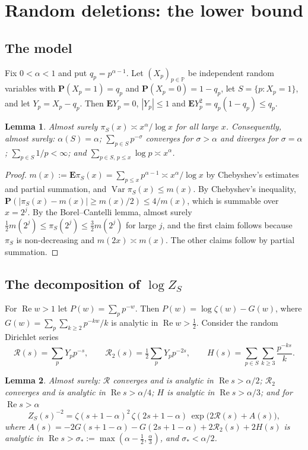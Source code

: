 \documentclass[11pt]{amsart}
\newtheorem{lemma}{Lemma}[section]
\theoremstyle{remark}
\numberwithin{equation}{section}
\newcommand{\PP}{\mathbb{P}}
\newcommand{\Prob}{\mathbf{P}}
\newcommand{\Ex}{\mathbf{E}}
\newcommand{\cR}{\mathcal{R}}
\DeclareMathOperator{\re}{Re}
\DeclareMathOperator{\Var}{Var}
\begin{document}
\section{Random deletions: the lower bound}\label{sec:lower}

\subsection{The model}
Fix $0<\alpha<1$ and put $q_p=p^{\alpha-1}$. Let $(X_p)_{p\in\PP}$ be independent random variables with $\Prob(X_p=1)=q_p$ and $\Prob(X_p=0)=1-q_p$, let $S=\{p:X_p=1\}$, and let $Y_p=X_p-q_p$. Then $\Ex Y_p=0$, $|Y_p|\le1$ and $\Ex Y_p^2=q_p(1-q_p)\le q_p$.

\begin{lemma}\label{lem:count}
Almost surely $\pi_S(x)\asymp x^{\alpha}/\log x$ for all large $x$. Consequently, almost surely: $\alpha(S)=\alpha$; $\sum_{p\in S}p^{-\sigma}$ converges for $\sigma>\alpha$ and diverges for $\sigma=\alpha$; $\sum_{p\in S}1/p<\infty$; and $\sum_{p\in S,\,p\le x}\log p\asymp x^{\alpha}$.
\end{lemma}

\begin{proof}
$m(x):=\Ex\pi_S(x)=\sum_{p\le x}p^{\alpha-1}\asymp x^{\alpha}/\log x$ by Chebyshev's estimates and partial summation, and $\Var\pi_S(x)\le m(x)$. By Chebyshev's inequality, $\Prob(|\pi_S(x)-m(x)|\ge m(x)/2)\le4/m(x)$, which is summable over $x=2^j$. By the Borel--Cantelli lemma, almost surely $\tfrac12m(2^j)\le\pi_S(2^j)\le\tfrac32m(2^j)$ for large $j$, and the first claim follows because $\pi_S$ is non-decreasing and $m(2x)\asymp m(x)$. The other claims follow by partial summation.
\end{proof}

\subsection{The decomposition of $\log Z_S$}
For $\re w>1$ let $P(w)=\sum_pp^{-w}$. Then $P(w)=\log\zeta(w)-G(w)$, where $G(w)=\sum_p\sum_{k\ge2}p^{-kw}/k$ is analytic in $\re w>\tfrac12$. Consider the random Dirichlet series
\[
\cR(s)=\sum_pY_pp^{-s},\qquad \cR_2(s)=\tfrac12\sum_pY_pp^{-2s},\qquad H(s)=\sum_{p\in S}\sum_{k\ge3}\frac{p^{-ks}}{k}.
\]

\begin{lemma}\label{lem:series}
Almost surely: $\cR$ converges and is analytic in $\re s>\alpha/2$; $\cR_2$ converges and is analytic in $\re s>\alpha/4$; $H$ is analytic in $\re s>\alpha/3$; and for $\re s>\alpha$
\begin{equation}\label{eq:V}
Z_S(s)^{-2}=\zeta(s+1-\alpha)^2\,\zeta(2s+1-\alpha)\,\exp\bigl(2\cR(s)+A(s)\bigr),
\end{equation}
where $A(s)=-2G(s+1-\alpha)-G(2s+1-\alpha)+2\cR_2(s)+2H(s)$ is analytic in $\re s>\sigma_*:=\max(\alpha-\tfrac12,\tfrac{\alpha}{3})$, and $\sigma_*<\alpha/2$.
\end{lemma}
\end{document}

